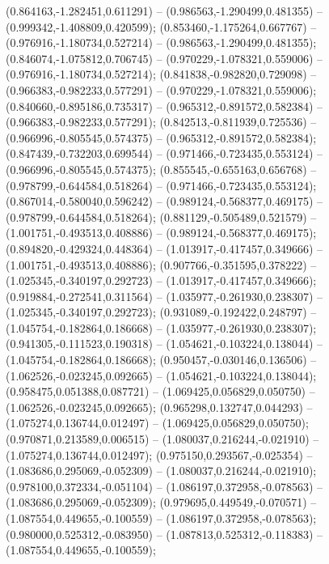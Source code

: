 (0.864163,-1.282451,0.611291) -- (0.986563,-1.290499,0.481355) -- (0.999342,-1.408809,0.420599);
 (0.853460,-1.175264,0.667767) -- (0.976916,-1.180734,0.527214) -- (0.986563,-1.290499,0.481355);
 (0.846074,-1.075812,0.706745) -- (0.970229,-1.078321,0.559006) -- (0.976916,-1.180734,0.527214);
 (0.841838,-0.982820,0.729098) -- (0.966383,-0.982233,0.577291) -- (0.970229,-1.078321,0.559006);
 (0.840660,-0.895186,0.735317) -- (0.965312,-0.891572,0.582384) -- (0.966383,-0.982233,0.577291);
 (0.842513,-0.811939,0.725536) -- (0.966996,-0.805545,0.574375) -- (0.965312,-0.891572,0.582384);
 (0.847439,-0.732203,0.699544) -- (0.971466,-0.723435,0.553124) -- (0.966996,-0.805545,0.574375);
 (0.855545,-0.655163,0.656768) -- (0.978799,-0.644584,0.518264) -- (0.971466,-0.723435,0.553124);
 (0.867014,-0.580040,0.596242) -- (0.989124,-0.568377,0.469175) -- (0.978799,-0.644584,0.518264);
 (0.881129,-0.505489,0.521579) -- (1.001751,-0.493513,0.408886) -- (0.989124,-0.568377,0.469175);
 (0.894820,-0.429324,0.448364) -- (1.013917,-0.417457,0.349666) -- (1.001751,-0.493513,0.408886);
 (0.907766,-0.351595,0.378222) -- (1.025345,-0.340197,0.292723) -- (1.013917,-0.417457,0.349666);
 (0.919884,-0.272541,0.311564) -- (1.035977,-0.261930,0.238307) -- (1.025345,-0.340197,0.292723);
 (0.931089,-0.192422,0.248797) -- (1.045754,-0.182864,0.186668) -- (1.035977,-0.261930,0.238307);
 (0.941305,-0.111523,0.190318) -- (1.054621,-0.103224,0.138044) -- (1.045754,-0.182864,0.186668);
 (0.950457,-0.030146,0.136506) -- (1.062526,-0.023245,0.092665) -- (1.054621,-0.103224,0.138044);
 (0.958475,0.051388,0.087721) -- (1.069425,0.056829,0.050750) -- (1.062526,-0.023245,0.092665);
 (0.965298,0.132747,0.044293) -- (1.075274,0.136744,0.012497) -- (1.069425,0.056829,0.050750);
 (0.970871,0.213589,0.006515) -- (1.080037,0.216244,-0.021910) -- (1.075274,0.136744,0.012497);
 (0.975150,0.293567,-0.025354) -- (1.083686,0.295069,-0.052309) -- (1.080037,0.216244,-0.021910);
 (0.978100,0.372334,-0.051104) -- (1.086197,0.372958,-0.078563) -- (1.083686,0.295069,-0.052309);
 (0.979695,0.449549,-0.070571) -- (1.087554,0.449655,-0.100559) -- (1.086197,0.372958,-0.078563);
 (0.980000,0.525312,-0.083950) -- (1.087813,0.525312,-0.118383) -- (1.087554,0.449655,-0.100559);
